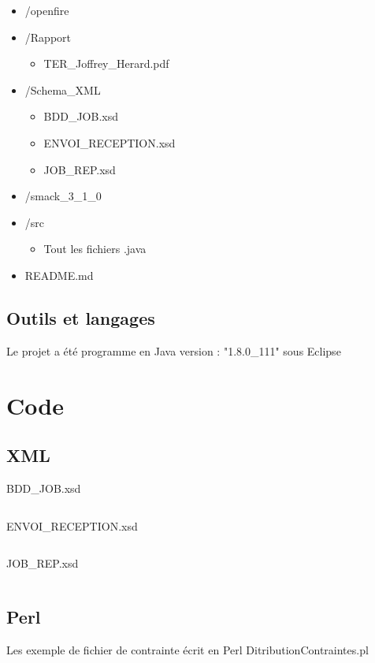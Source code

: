 \documentclass[11pt]{report}
\begin{document}
\begin{itemize}
\begin{itemize}
		\item /openfire
		\item /Rapport \begin{itemize}\item TER\_Joffrey\_Herard.pdf  \end{itemize} 
		\item /Schema\_XML \begin{itemize}\item BDD\_JOB.xsd \item ENVOI\_RECEPTION.xsd \item JOB\_REP.xsd \end{itemize}
		\item /smack\_3\_1\_0
		\item /src \begin{itemize}\item Tout les fichiers .java \end{itemize}
		\item README.md 
\end{itemize}

\end{itemize}
\subsection{Outils et langages} 
Le projet a été programme en Java version : "1.8.0\_111" sous Eclipse  

\newpage
\section{Code}
\subsection{XML} 

BDD\_JOB.xsd
\inputminted[tabsize=2,frame=lines,linenos]{XML}{../Schema_XML/BDD_JOB.xsd}

ENVOI\_RECEPTION.xsd
\inputminted[tabsize=2,frame=lines,linenos]{XML}{../Schema_XML/ENVOI_RECEPTION.xsd}
\newpage
JOB\_REP.xsd
\inputminted[tabsize=2,frame=lines,linenos]{XML}{../Schema_XML/JOB_REP.xsd}
\newpage
\subsection{Perl}
Les exemple de fichier de contrainte écrit en Perl 
DitributionContraintes.pl
\inputminted[tabsize=2,frame=lines,linenos]{Perl}{../Echantillon_Script_Perl/DitributionContraintes.pl}
\newpage
\end{document}
